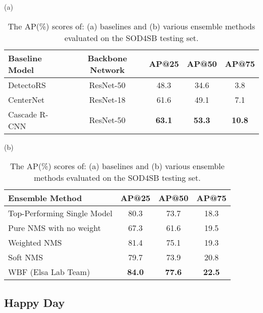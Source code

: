 \documentclass{mva_style}
\begin{document}
\begin{table}[t]
    \caption{\small{The AP(\%) scores of: (a) baselines and (b) various ensemble methods evaluated on the SOD4SB testing set.}}
    \label{table:team1}
    \centering
    \small
    \begin{adjustbox}{max width=.475\textwidth}
        (a)
        \begin{tabular}{lcccc}
        \toprule
        Baseline Model      & Backbone Network    & AP@25 & \textbf{AP@50} & AP@75 \\
        \midrule
        DetectoRS~\cite{qiao2021detectors}           & ResNet-50           & 48.3    & 34.6               & 3.8    \\
        CenterNet~\cite{zhou2019objects}~\cite{baselinecode_mva2023_sod_challenge}           & ResNet-18           & 61.6    & 49.1               & 7.1    \\
        Cascade R-CNN~\cite{cai2018cascade}        & ResNet-50           & \textbf{63.1}    & \textbf{53.3}               & \textbf{10.8}    \\
        \bottomrule
    \end{tabular}
    \end{adjustbox}
    \begin{adjustbox}{max width=.475\textwidth}
        (b)
        \begin{tabular}{lccc}
        \toprule
        Ensemble Method          & AP@25 & \textbf{AP@50} & AP@75 \\
        \midrule
        \multirow{1}{5.75cm}{Top-Performing Single Model} & 80.3    & 73.7               & 18.3    \\
        Pure NMS with no weight    & 67.3    & 61.6               & 19.5    \\
        Weighted NMS               & 81.4    & 75.1               & 19.3    \\
        Soft NMS                   & 79.7    & 73.9               & 20.8    \\
        WBF (Elsa Lab Team)                        & \textbf{84.0}    & \textbf{77.6}               & \textbf{22.5}    \\
        \bottomrule
    \end{tabular}
    \end{adjustbox}
    \vspace{-1em}
\end{table}


\subsection{Happy Day}
\end{document}
